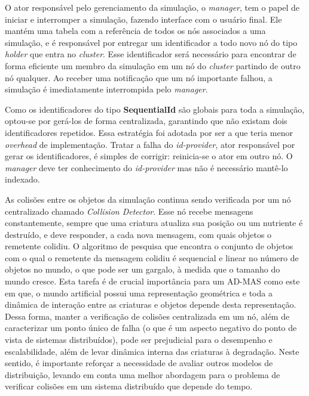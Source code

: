 O ator responsável pelo gerenciamento da simulação, o \textit{manager}, tem o papel de iniciar e interromper a simulação, fazendo interface com o usuário final. Ele mantém uma tabela com a referência de todos os nós associados a uma simulação, e é responsável por entregar um identificador a todo novo nó  do tipo \textit{holder} que entra no \textit{cluster}. Esse identificador será necessário para encontrar de forma eficiente um membro da simulação em um nó do \textit{cluster} partindo de outro nó qualquer. Ao receber uma notificação que um nó importante falhou, a simulação é imediatamente interrompida pelo \textit{manager}. 

Como os identificadores do tipo \textbf{SequentialId} são globais para toda a simulação, optou-se por gerá-los de forma centralizada, garantindo que não existam dois identificadores repetidos. Essa estratégia foi adotada por ser a que teria menor \textit{overhead} de implementação. Tratar a falha do \textit{id-provider}, ator responsável por gerar os identificadores, é simples de corrigir: reinicia-se o ator em outro nó. O \textit{manager} deve ter conhecimento do \textit{id-provider} mas não é necessário mantê-lo indexado.

As colisões entre os objetos da simulação continua sendo verificada por um nó centralizado chamado \textit{Collision Detector}. Esse nó recebe mensagens constantemente, sempre que uma criatura atualiza sua posição ou um nutriente é destruído, e deve responder, a cada nova mensagem, com quais objetos o remetente colidiu. O algoritmo de pesquisa que encontra o conjunto de objetos com o qual o remetente da mensagem colidiu é sequencial e linear no número de objetos no mundo, o que pode ser um gargalo, à medida que o tamanho do mundo cresce. Esta tarefa é de crucial importância para um AD-MAS como este em que, o mundo artificial possui uma representação geométrica e toda a dinâmica de interação entre as criaturas e objetos depende desta representação. Dessa forma, manter a verificação de colisões centralizada em um nó, além de caracterizar um ponto único de falha (o que é um aspecto negativo do ponto de vista de sistemas distribuídos), pode ser prejudicial para o desempenho e escalabilidade, além de levar dinâmica interna das criaturas à degradação. Neste sentido, é importante reforçar a necessidade de avaliar outros modelos de distribuição, levando em conta uma melhor abordagem para o problema de verificar colisões em um sistema distribuído que depende do tempo.  

